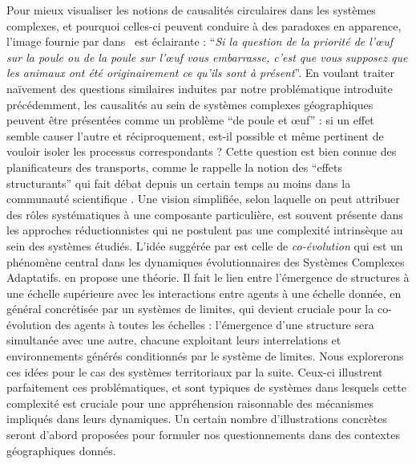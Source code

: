 {Pour mieux visualiser les notions de causalités circulaires dans les systèmes complexes, et pourquoi celles-ci peuvent conduire à des paradoxes en apparence, l'image fournie par  dans~\cite{diderot1965entretien} est éclairante : ``\textit{Si la question de la priorit{\'e} de l'\oe{}uf sur la poule ou de la poule sur l'\oe{}uf vous embarrasse, c'est que vous supposez que les animaux ont {\'e}t{\'e} originairement ce qu'ils sont {\`a} pr{\'e}sent}''. En voulant traiter naïvement des questions similaires induites par notre problématique introduite précédemment, les causalités au sein de systèmes complexes géographiques peuvent être présentées comme un problème ``de poule et {\oe}uf'' : si un effet semble causer l'autre et réciproquement, est-il possible et même pertinent de vouloir isoler les processus correspondants ? Cette question est bien connue des planificateurs des transports, comme le rappelle la notion des ``effets structurants'' qui fait débat depuis un certain temps au moins dans la communauté scientifique . Une vision simplifiée, selon laquelle on peut attribuer des rôles systématiques à une composante particulière, est souvent présente dans les approches réductionnistes qui ne postulent pas une complexité intrinsèque au sein des systèmes étudiés. L'idée suggérée par  est celle de \emph{co-évolution} qui est un phénomène central dans les dynamiques évolutionnaires des Systèmes Complexes Adaptatifs. \cite{holland2012signals} en propose une théorie. Il fait le lien entre l'émergence de structures à une échelle supérieure avec les interactions entre agents à une échelle donnée, en général concrétisée par un systèmes de limites, qui devient cruciale pour la co-évolution des agents à toutes les échelles : l'émergence d'une structure sera simultanée avec une autre, chacune exploitant leurs interrelations et environnements générés conditionnés par le système de limites. Nous explorerons ces idées pour le cas des systèmes territoriaux par la suite. Ceux-ci illustrent parfaitement ces problématiques, et sont typiques de systèmes dans lesquels cette complexité est cruciale pour une appréhension raisonnable des mécanismes impliqués dans leurs dynamiques. Un certain nombre d'illustrations concrètes seront d'abord proposées pour formuler nos questionnements dans des contextes géographiques donnés.
}



